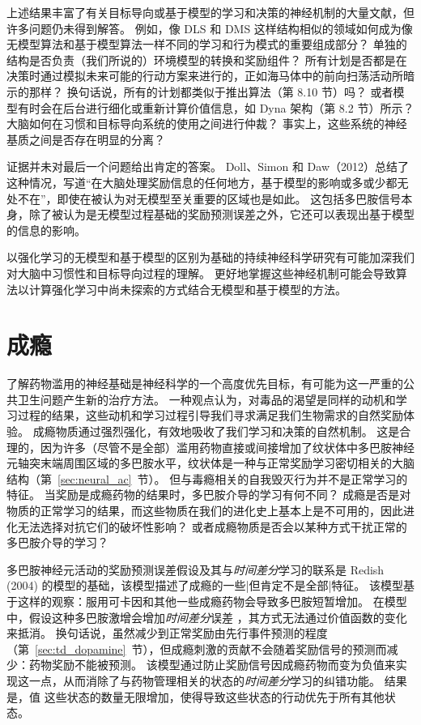 上述结果丰富了有关目标导向或基于模型的学习和决策的神经机制的大量文献，但许多问题仍未得到解答。
例如，像 DLS 和 DMS 这样结构相似的领域如何成为像无模型算法和基于模型算法一样不同的学习和行为模式的重要组成部分？
单独的结构是否负责（我们所说的）环境模型的转换和奖励组件？
所有计划是否都是在决策时通过模拟未来可能的行动方案来进行的，正如海马体中的前向扫荡活动所暗示的那样？
换句话说，所有的计划都类似于推出算法（第 8.10 节）吗？
或者模型有时会在后台进行细化或重新计算价值信息，如 Dyna 架构（第 8.2 节）所示？
大脑如何在习惯和目标导向系统的使用之间进行仲裁？
事实上，这些系统的神经基质之间是否存在明显的分离？


证据并未对最后一个问题给出肯定的答案。
Doll、Simon 和 Daw（2012）总结了这种情况，写道“在大脑处理奖励信息的任何地方，基于模型的影响或多或少都无处不在”，即使在被认为对无模型至关重要的区域也是如此。
这包括多巴胺信号本身，除了被认为是无模型过程基础的奖励预测误差之外，它还可以表现出基于模型的信息的影响。


以强化学习的无模型和基于模型的区别为基础的持续神经科学研究有可能加深我们对大脑中习惯性和目标导向过程的理解。
更好地掌握这些神经机制可能会导致算法以计算强化学习中尚未探索的方式结合无模型和基于模型的方法。


\section{成瘾}


了解药物滥用的神经基础是神经科学的一个高度优先目标，有可能为这一严重的公共卫生问题产生新的治疗方法。
一种观点认为，对毒品的渴望是同样的动机和学习过程的结果，这些动机和学习过程引导我们寻求满足我们生物需求的自然奖励体验。
成瘾物质通过强烈强化，有效地吸收了我们学习和决策的自然机制。
这是合理的，因为许多（尽管不是全部）滥用药物直接或间接增加了纹状体中多巴胺神经元轴突末端周围区域的多巴胺水平，纹状体是一种与正常奖励学习密切相关的大脑结构（第~\ref{sec:neural_ac}~节）。
但与毒瘾相关的自我毁灭行为并不是正常学习的特征。
当奖励是成瘾药物的结果时，多巴胺介导的学习有何不同？
成瘾是否是对物质的正常学习的结果，而这些物质在我们的进化史上基本上是不可用的，因此进化无法选择对抗它们的破坏性影响？
或者成瘾物质是否会以某种方式干扰正常的多巴胺介导的学习？


多巴胺神经元活动的奖励预测误差假设及其与\textit{时间差分}学习的联系是 Redish (2004) 的模型的基础，该模型描述了成瘾的一些|但肯定不是全部|特征。
该模型基于这样的观察：服用可卡因和其他一些成瘾药物会导致多巴胺短暂增加。
在模型中，假设这种多巴胺激增会增加\textit{时间差分}误差 ，其方式无法通过价值函数的变化来抵消。
换句话说，虽然减少到正常奖励由先行事件预测的程度（第~\ref{sec:td_dopamine}~节），但成瘾刺激的贡献不会随着奖励信号的预测而减少：药物奖励不能被预测。
该模型通过防止奖励信号因成瘾药物而变为负值来实现这一点，从而消除了与药物管理相关的状态的\textit{时间差分}学习的纠错功能。
结果是，值 这些状态的数量无限增加，使得导致这些状态的行动优先于所有其他状态。


